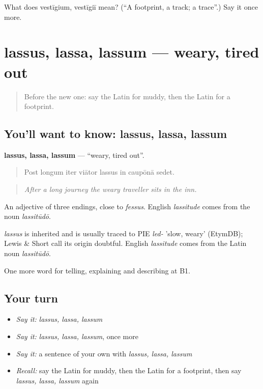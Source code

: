 \begin{tcolorbox}[breakable,colback=teal!4,colframe=teal!35!black,title={Before you move on}]
What does vestīgium, vestīgiī mean? (\textquotedblleft{}A footprint, a track; a trace\textquotedblright{}.) Say it once more.
\end{tcolorbox}
\section[lassus, lassa, lassum]{lassus, lassa, lassum — weary, tired out}

\label{lesson:LA-C426-lassus}



\begin{quote}
Before the new one: say the Latin for muddy, then the Latin for a footprint.
\end{quote}

\subsection*{You'll want to know: lassus, lassa, lassum}
\textbf{lassus, lassa, lassum} — \textquotedblleft{}weary, tired out\textquotedblright{}.

\begin{quote}
Post longum iter viātor lassus in caupōnā sedet.
\end{quote}

\begin{quote}
\emph{After a long journey the weary traveller sits in the inn.}
\end{quote}

An adjective of three endings, close to \emph{fessus}. English \emph{lassitude} comes from the noun \emph{lassitūdō}.

\begin{cousinweb}
\emph{lassus} is inherited and is usually traced to PIE \emph{led-} 'slow, weary' (EtymDB); Lewis \& Short call its origin doubtful. English \emph{lassitude} comes from the Latin noun \emph{lassitūdō}.
\end{cousinweb}

\begin{grammarlens}[title={What you've built}]
One more word for telling, explaining and describing at B1.
\end{grammarlens}

\subsection*{Your turn}
\begin{itemize}
\raggedright
  \item \emph{Say it:} \emph{lassus, lassa, lassum}
  \item \emph{Say it:} \emph{lassus, lassa, lassum}, once more
  \item \emph{Say it:} a sentence of your own with \emph{lassus, lassa, lassum}
  \item \emph{Recall:} say the Latin for muddy, then the Latin for a footprint, then say \emph{lassus, lassa, lassum} again
\end{itemize}

